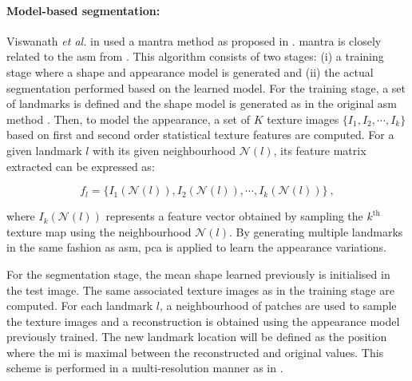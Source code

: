 \paragraph{Model-based segmentation:}
Viswanath \textit{et al.} in \cite{Viswanath2008a,Viswanath2009} used a \ac{mantra} method as proposed in \cite{Toth2008}.
\ac{mantra} is closely related to the \ac{asm} from \cite{Cootes1995}.
This algorithm consists of two stages: (i) a training stage where a shape and appearance model is generated and (ii) the actual segmentation performed based on the learned model. 
For the training stage, a set of landmarks is defined and the shape model is generated as in the original \ac{asm} method \cite{Cootes1995}.
Then, to model the appearance, a set of $K$ texture images $\{I_1,I_2,\cdots,I_k\}$ based on first and second order statistical texture features are computed.
For a given landmark $l$ with its given neighbourhood $\mathcal{N}(l)$, its feature matrix extracted can be expressed as:

\begin{equation}
	f_l = \{ I_1(\mathcal{N}(l)), I_2(\mathcal{N}(l)), \cdots, I_k(\mathcal{N}(l)) \} \ ,
	\label{eq:mantra1}
\end{equation}

\noindent where $I_k(\mathcal{N}(l))$ represents a feature vector obtained by sampling the $k^{\text{th}}$ texture map using the neighbourhood $\mathcal{N}(l)$.
By generating multiple landmarks in the same fashion as \ac{asm}, \ac{pca} \cite{Pearson1901} is applied to learn the appearance variations.

For the segmentation stage, the mean shape learned previously is initialised in the test image.
The same associated texture images as in the training stage are computed.
For each landmark $l$, a neighbourhood of patches are used to sample the texture images and a reconstruction is obtained using the appearance model previously trained.
The new landmark location will be defined as the position where the \ac{mi} is maximal between the reconstructed and original values.
This scheme is performed in a multi-resolution manner as in \cite{Cootes1995}.

